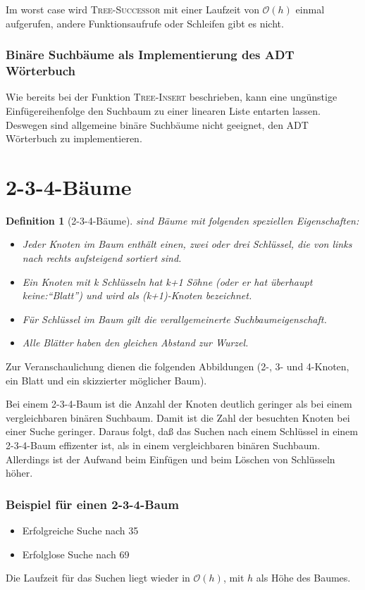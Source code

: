 \documentclass[ngerman,draft,parskip=half*,twoside]{scrreprt}
\theoremstyle{break}
\newtheorem{definition}{Definition}[chapter]
\theoremstyle{nonumberbreak}
\newcommand*{\OO}{\mathcal{O}}      %
\newcommand*{\highl}[2][]{\textbf{\boldmath{#2}}%
  \ifthenelse{\equal{#1}{}}{\index{#2}}{\index{#1}}%
}
\begin{document}
		Im worst case wird \textsc{Tree-Successor} mit einer Laufzeit von $\OO(h)$ einmal aufgerufen, 
		andere Funktionsaufrufe oder Schleifen gibt es nicht.
\subsubsection{Binäre Suchbäume als Implementierung des ADT Wörterbuch}
 		
	  	Wie bereits bei der Funktion \textsc{Tree-Insert} beschrieben, kann eine ungünstige 
	  	Einfügereihenfolge den Suchbaum zu einer linearen Liste entarten lassen. Deswegen sind allgemeine 
	  	binäre Suchbäume nicht geeignet, den ADT Wörterbuch zu implementieren.  	
\section{2-3-4-Bäume}
\begin{definition}[2-3-4-Bäume]
\highl{2-3-4-Bäume} sind Bäume mit folgenden speziellen Eigenschaften:
\begin{itemize}
				\item Jeder Knoten im Baum enthält einen, zwei oder drei Schlüssel, 
							die von links nach rechts aufsteigend sortiert sind.		
				\item Ein Knoten mit k Schlüsseln hat k+1 Söhne (oder er hat überhaupt keine:``Blatt'') und wird als
							 (k+1)-Knoten bezeichnet.
				\item Für Schlüssel im Baum gilt die verallgemeinerte Suchbaumeigenschaft.
				\item Alle Blätter haben den gleichen Abstand zur Wurzel.	
			\end{itemize}
\end{definition}
Zur Veranschaulichung dienen die folgenden Abbildungen (2-, 3- und 4-Knoten, ein Blatt und ein skizzierter möglicher Baum).
			 			
				
	 			
		Bei einem 2-3-4-Baum ist die Anzahl der Knoten deutlich geringer als bei
		einem vergleichbaren binären Suchbaum. Damit ist die Zahl der besuchten 
		Knoten bei einer Suche geringer. Daraus folgt, daß das Suchen nach einem
		Schlüssel in einem 2-3-4-Baum effizenter ist, als in einem vergleichbaren binären Suchbaum.
		Allerdings ist der Aufwand beim Einfügen und beim Löschen von Schlüsseln höher.
\subsubsection{Beispiel für einen 2-3-4-Baum}
		
		\begin{itemize}
			\item Erfolgreiche Suche nach 35
			\item Erfolglose Suche nach 69
		\end{itemize}
		Die Laufzeit für das Suchen liegt wieder in $\OO(h)$, mit $h$ als Höhe des Baumes.
\end{document}

